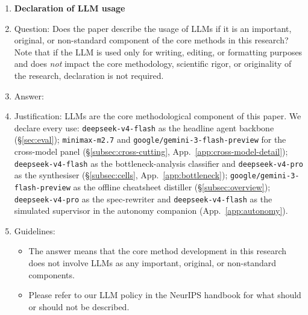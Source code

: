 \begin{enumerate}
\item {\bf Declaration of LLM usage}
    \item[] Question: Does the paper describe the usage of LLMs if it is an important, original, or non-standard component of the core methods in this research? Note that if the LLM is used only for writing, editing, or formatting purposes and does \emph{not} impact the core methodology, scientific rigor, or originality of the research, declaration is not required.
    \item[] Answer: \answerYes{}
    \item[] Justification: LLMs are the core methodological component of this paper. We declare every use: \texttt{deepseek-v4-flash} as the headline agent backbone (\S\ref{sec:eval}); \texttt{minimax-m2.7} and \texttt{google/gemini-3-flash-preview} for the cross-model panel (\S\ref{subsec:cross-cutting}, App.~\ref{app:cross-model-detail}); \texttt{deepseek-v4-flash} as the bottleneck-analysis classifier and \texttt{deepseek-v4-pro} as the synthesiser (\S\ref{subsec:cells}, App.~\ref{app:bottleneck}); \texttt{google/gemini-3-flash-preview} as the offline cheatsheet distiller (\S\ref{subsec:overview}); \texttt{deepseek-v4-pro} as the spec-rewriter and \texttt{deepseek-v4-flash} as the simulated supervisor in the autonomy companion (App.~\ref{app:autonomy}).
    \item[] Guidelines:
    \begin{itemize}
        \item The answer \answerNA{} means that the core method development in this research does not involve LLMs as any important, original, or non-standard components.
        \item Please refer to our LLM policy in the NeurIPS handbook for what should or should not be described.
    \end{itemize}

\end{enumerate}
